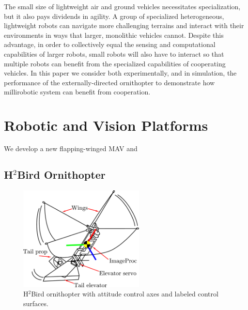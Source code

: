 \documentclass{aamas2013}
\begin{document}
The small size of lightweight air and ground vehicles necessitates 
specialization, but it also pays dividends in agility. A group of specialized 
heterogeneous, lightweight robots can navigate more challenging terrains and 
interact with their environments in ways that larger, monolithic vehicles 
cannot. Despite this advantage, in order to collectively equal the sensing and 
computational capabilities of larger robots, small robots will also have to interact 
so that multiple robots can benefit from the specialized capabilities of 
cooperating vehicles. In this paper we consider both experimentally, and in 
simulation, the performance of the externally-directed ornithopter to 
demonstrate how millirobotic system can benefit from cooperation.

\section{Robotic and Vision Platforms}

We develop a new flapping-winged MAV and 

\subsection{H$^2$Bird Ornithopter}

\begin{figure}[!tb]
\centering
\includegraphics[height=150pt]{figures/h2bird_axes.pdf}
\caption{H$^2$Bird ornithopter with attitude control axes and labeled 
control surfaces.}
\label{fig:h2Bird_axes}
\end{figure}
\end{document}
